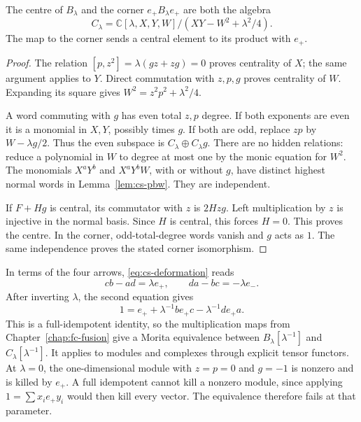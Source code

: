 \begin{theorem}\label{thm:cs-centre}
The centre of \(B_\lambda\) and the corner \(e_+B_\lambda e_+\) are
both the algebra
\[
 C_\lambda=
 \mathbb C[\lambda,X,Y,W]/(XY-W^2+\lambda^2/4).
\]
The map to the corner sends a central element to its product with
\(e_+\).
\end{theorem}
\begin{proof}
The relation \([p,z^2]=\lambda(gz+zg)=0\) proves centrality of
\(X\); the same argument applies to \(Y\). Direct commutation with
\(z,p,g\) proves centrality of \(W\). Expanding its square gives
\(W^2=z^2p^2+\lambda^2/4\).

A word commuting with \(g\) has even total \(z,p\) degree.
If both exponents are even it is a monomial in \(X,Y\), possibly
times \(g\). If both are odd, replace \(zp\) by \(W-\lambda g/2\).
Thus the even subspace is \(C_\lambda\oplus C_\lambda g\).
There are no hidden relations: reduce a polynomial in \(W\) to
degree at most one by the monic equation for \(W^2\).
The monomials \(X^aY^b\) and \(X^aY^bW\), with or without \(g\),
have distinct highest normal words in Lemma~\ref{lem:cs-pbw}.
They are independent.

If \(F+Hg\) is central, its commutator with \(z\) is \(2Hzg\).
Left multiplication by \(z\) is injective in the normal basis.
Since \(H\) is central, this forces \(H=0\). This proves the centre.
In the corner, odd-total-degree words vanish and \(g\) acts as \(1\).
The same independence proves the stated corner isomorphism.
\end{proof}

In terms of the four arrows, \eqref{eq:cs-deformation} reads
\begin{equation}\label{eq:cs-deformed-arrows}
 cb-ad=\lambda e_+,\qquad da-bc=-\lambda e_-.
\end{equation}
After inverting \(\lambda\), the second equation gives
\begin{equation}\label{eq:cs-full}
 1=e_++\lambda^{-1}be_+c-\lambda^{-1}de_+a.
\end{equation}
This is a full-idempotent identity, so the multiplication maps from
Chapter~\ref{chap:fc-fusion} give a Morita equivalence between
\(B_\lambda[\lambda^{-1}]\) and \(C_\lambda[\lambda^{-1}]\).
It applies to modules and complexes through explicit tensor functors.
At \(\lambda=0\), the one-dimensional module with \(z=p=0\) and
\(g=-1\) is nonzero and is killed by \(e_+\). A full idempotent
cannot kill a nonzero module, since applying
\(1=\sum x_i e_+ y_i\) would then kill every vector.
The equivalence therefore fails at that parameter.

